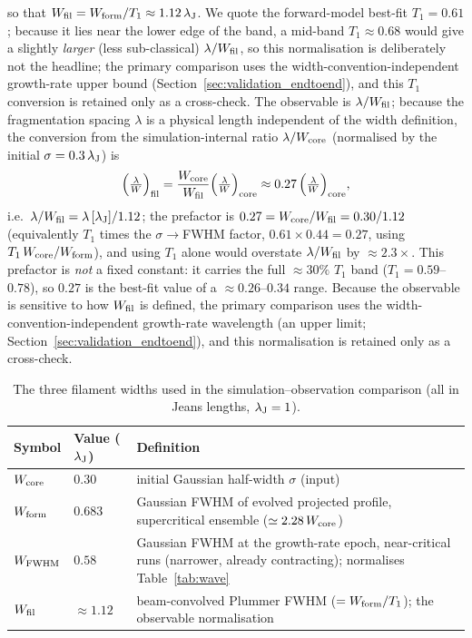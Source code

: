\documentclass[usenatbib,twoside,twocolumn]{mnras}
\begin{document}
so that $W_{\rm fil}=W_{\rm form}/T_1\approx1.12\,\lambda_{\rm J}$. We quote the forward-model best-fit $T_1=0.61$; because it lies near the lower edge of the band, a mid-band $T_1\approx0.68$ would give a slightly \emph{larger} (less sub-classical) $\lambda/W_{\rm fil}$, so this normalisation is deliberately not the headline; the primary comparison uses the width-convention-independent growth-rate upper bound (Section~\ref{sec:validation_endtoend}), and this $T_1$ conversion is retained only as a cross-check. The observable is $\lambda/W_{\rm fil}$; because the fragmentation spacing $\lambda$ is a physical length independent of the width definition, the conversion from the simulation-internal ratio $\lambda/W_{\rm core}$ (normalised by the initial $\sigma=0.3\,\lambda_{\rm J}$) is
\begin{equation}
\Big(\tfrac{\lambda}{W}\Big)_{\rm fil} = \frac{W_{\rm core}}{W_{\rm fil}}\Big(\tfrac{\lambda}{W}\Big)_{\rm core} \approx 0.27\,\Big(\tfrac{\lambda}{W}\Big)_{\rm core},
\label{eq:t1_apply}
\end{equation}
i.e.\ $\lambda/W_{\rm fil}=\lambda\,[\lambda_{\rm J}]/1.12$; the prefactor is $0.27=W_{\rm core}/W_{\rm fil}=0.30/1.12$ (equivalently $T_1$ times the $\sigma\!\to\!$FWHM factor, $0.61\times0.44=0.27$, using $T_1\,W_{\rm core}/W_{\rm form}$), and using $T_1$ alone would overstate $\lambda/W_{\rm fil}$ by $\approx2.3\times$. This prefactor is \emph{not} a fixed constant: it carries the full $\approx30\%$ $T_1$ band ($T_1=0.59$--$0.78$), so $0.27$ is the best-fit value of a $\approx0.26$--$0.34$ range. Because the observable is sensitive to how $W_{\rm fil}$ is defined, the primary comparison uses the width-convention-independent growth-rate wavelength (an upper limit; Section~\ref{sec:validation_endtoend}), and this normalisation is retained only as a cross-check.

\begin{table}
\caption{The three filament widths used in the simulation--observation comparison (all in Jeans lengths, $\lambda_{\rm J}=1$).}
\label{tab:widthdefs}
\footnotesize
\setlength{\tabcolsep}{3pt}
\begin{tabular}{p{1.5cm}p{1.4cm}p{4.0cm}}
\toprule
Symbol & Value ($\lambda_{\rm J}$) & Definition \\
\midrule
$W_{\rm core}$ & $0.30$ & initial Gaussian half-width $\sigma$ (input) \\
$W_{\rm form}$ & $0.683$ & Gaussian FWHM of evolved projected profile, supercritical ensemble ($\simeq2.28\,W_{\rm core}$) \\
$W_{\rm FWHM}$ & $0.58$ & Gaussian FWHM at the growth-rate epoch, near-critical runs (narrower, already contracting); normalises Table~\ref{tab:wave} \\
$W_{\rm fil}$ & $\approx1.12$ & beam-convolved Plummer FWHM ($=W_{\rm form}/T_1$); the observable normalisation \\
\bottomrule
\end{tabular}
\end{table}
\end{document}
